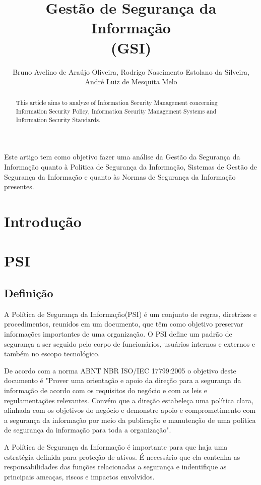 \documentclass[12pt]{article}
\title{Gestão de Segurança da Informação \\
(GSI)}
\author{Bruno Avelino de Araújo Oliveira, Rodrigo Nascimento Estolano da Silveira, André Luiz de Mesquita Melo }
\begin{document}
 

\maketitle

\begin{abstract}
    This article aims to analyze of Information Security Management concerning Information Security Policy, Information Security Management Systems and Information Security Standards.
\end{abstract}
     
\begin{resumo} 
Este artigo tem como objetivo fazer uma análise da
Gestão da Segurança da Informação quanto à Politica de Segurança da Informação, Sistemas de Gestão de Segurança da Informação e quanto às Normas de Segurança da Informação presentes.


\end{resumo}

\section{Introdução}

\section{PSI}
\subsection{Definição}
A Política de Segurança da Informação(PSI) é um conjunto de regras, diretrizes e procedimentos, reunidos em um documento, que
têm como objetivo preservar informações importantes de uma organização. 
O PSI define um padrão de segurança a ser seguido pelo corpo de funcionários, usuários internos e externos e 
também no escopo tecnológico.

De acordo com a norma ABNT NBR ISO/IEC 17799:2005 o objetivo deste documento é
"Prover uma orientação e apoio da direção para a segurança da informação de acordo com os requisitos do negócio e com as leis e regulamentações relevantes. Convém que a direção estabeleça uma política clara, alinhada com os objetivos do negócio e demonstre apoio e comprometimento com a segurança da informação por meio da publicação e manutenção de uma política de segurança da informação para toda a organização".

A Política de Segurança da Informação é importante para que haja uma estratégia definida para proteção de ativos.
É necessário que ela contenha as responsabilidades das funções relacionadas a segurança e indentifique as principais ameaças, riscos e impactos envolvidos.
\end{document}
